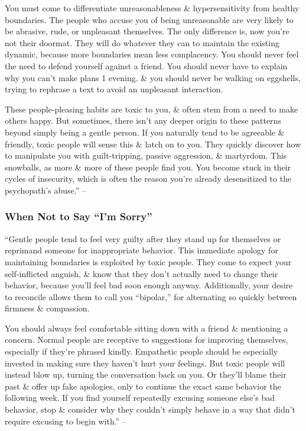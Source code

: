 \documentclass{article}
\numberwithin{equation}{section}
\begin{document}
You must come to differentiate unreasonableness \& hypersensitivity from healthy boundaries. The people who accuse you of being unreasonable are very likely to be abrasive, rude, or unpleasant themselves. The only difference is, now you're not their doormat. They will do whatever they can to maintain the existing dynamic, because more boundaries mean less complacency. You should never feel the need to defend yourself against a friend. You should never have to explain why you can't make plans 1 evening. \& you should never be walking on eggshells, trying to rephrase a text to avoid an unpleasant interaction.

These people-pleasing habits are toxic to you, \& often stem from a need to make others happy. But sometimes, there isn't any deeper origin to these patterns beyond simply being a gentle person. If you naturally tend to be agreeable \& friendly, toxic people will sense this \& latch on to you. They quickly discover how to manipulate you with guilt-tripping, passive aggression, \& martyrdom. This snowballs, as more \& more of these people find you. You become stuck in their cycles of insecurity, which is often the reason you're already desensitized to the psychopath's abuse.'' -- \cite[pp. 161--162]{MacKenzie2015}

\subsubsection{When Not to Say ``I'm Sorry''}
``Gentle people tend to feel very guilty after they stand up for themselves or reprimand someone for inappropriate behavior. This immediate apology for maintaining boundaries is exploited by toxic people. They come to expect your self-inflicted anguish, \& know that they don't actually need to change their behavior, because you'll feel bad soon enough anyway. Additionally, your desire to reconcile allows them to call you ``bipolar,'' for alternating so quickly between firmness \& compassion.

You should always feel comfortable sitting down with a friend \& mentioning a concern. Normal people are receptive to suggestions for improving themselves, especially if they're phrased kindly. Empathetic people should be especially invested in making sure they haven't hurt your feelings. But toxic people will instead blow up, turning the conversation back on you. Or they'll blame their past \& offer up fake apologies, only to continue the exact same behavior the following week. If you find yourself repeatedly excusing someone else's bad behavior, stop \& consider why they couldn't simply behave in a way that didn't require excusing to begin with.'' -- \cite[p. 162]{MacKenzie2015}
\end{document}
